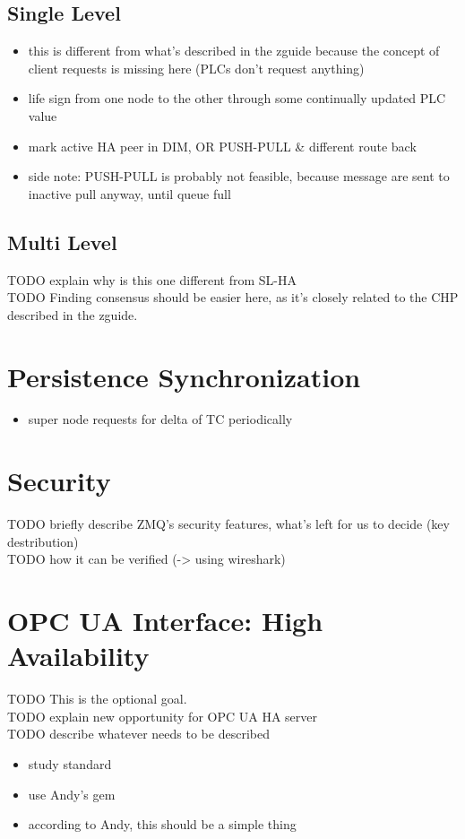 \subsection*{Single Level}
\begin{itemize}
	\item this is different from what's described in the zguide because the concept of client requests is missing here (PLCs don't request anything)
	\item life sign from one node to the other through some continually updated PLC value
	\item mark active HA peer in DIM, OR PUSH-PULL \& different route back
	\item side note: PUSH-PULL is probably not feasible, because message are sent to inactive pull anyway, until queue full
\end{itemize}

\subsection*{Multi Level}
TODO explain why is this one different from SL-HA\\
TODO Finding consensus should be easier here, as it's closely related to the CHP described in the zguide.\\

\section{Persistence Synchronization}\label{sec:meth:psync}
\begin{itemize}
	\item super node requests for delta of TC periodically
\end{itemize}

\section{Security}\label{sec:meth:security}
TODO briefly describe ZMQ's security features, what's left for us to decide (key destribution)\\
TODO how it can be verified (-> using wireshark)\\




\section{OPC UA Interface: High Availability}\label{sec:meth:opc-ua}
TODO This is the optional goal.\\
TODO explain new opportunity for OPC UA HA server\\
TODO describe whatever needs to be described\\

\begin{itemize}
	\item study standard
	\item use Andy's gem
	\item according to Andy, this should be a simple thing
\end{itemize}
